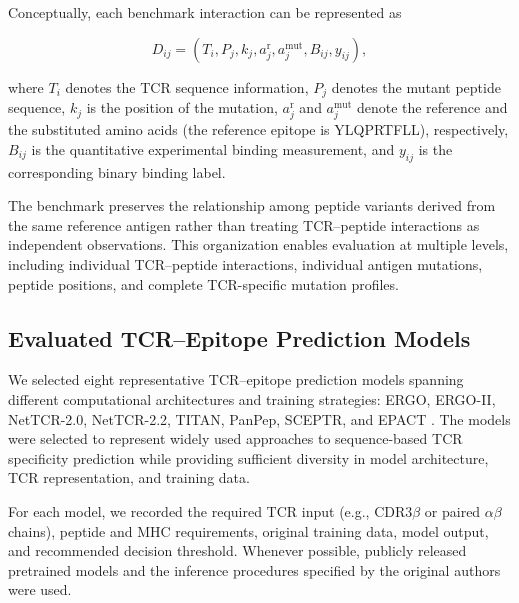 Conceptually, each benchmark interaction can be represented as

\begin{equation}
D_{ij}
=
\left(
T_i,P_j, k_j, a_j^{\mathrm{r}}, a_j^{\mathrm{mut}}, B_{ij}, y_{ij}
\right),
\label{eq:benchmark_record}
\end{equation}

where $T_i$ denotes the TCR sequence information, $P_j$ denotes the mutant 
peptide sequence, $k_j$ is the position of the mutation, $a_j^{\mathrm{r}}$ and $a_j^{\mathrm{mut}}$ denote the reference and the
substituted amino acids (the reference epitope is YLQPRTFLL), respectively, $B_{ij}$ is the quantitative 
experimental binding measurement, and $y_{ij}$ is the corresponding binary 
binding label.

The benchmark preserves the relationship among peptide variants derived from the same reference antigen rather than treating TCR--peptide interactions as 
independent observations. This organization enables evaluation at multiple levels, including individual TCR--peptide interactions, individual antigen 
mutations, peptide positions, and complete TCR-specific mutation profiles.



\subsection{Evaluated TCR--Epitope Prediction Models}
We selected eight representative TCR--epitope prediction models spanning 
different computational architectures and training strategies:
ERGO, ERGO-II, NetTCR-2.0, NetTCR-2.2, TITAN, PanPep, SCEPTR, and EPACT
\cite{ergo,ergo2,nettcr20,nettcr22,titan,panpep,sceptr,epact}.
The models were selected to represent widely used approaches to 
sequence-based TCR specificity prediction while providing sufficient 
diversity in model architecture, TCR representation, and training data.

For each model, we recorded the required TCR input (e.g., CDR3$\beta$ or 
paired $\alpha\beta$ chains), peptide and MHC requirements, original training 
data, model output, and recommended decision threshold. Whenever possible, 
publicly released pretrained models and the inference procedures specified 
by the original authors were used.

